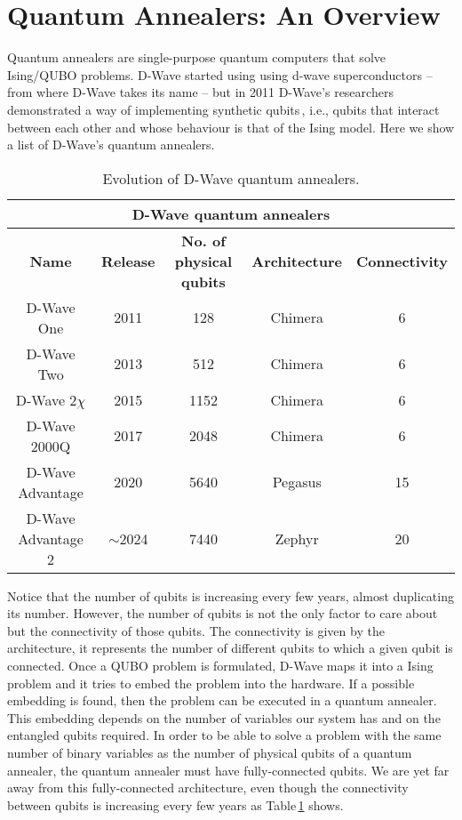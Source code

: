 \section{Quantum Annealers: An Overview} 
Quantum annealers are single-purpose quantum computers that solve Ising/QUBO problems. D-Wave started using using d-wave superconductors -- from where D-Wave takes its name -- but in 2011 D-Wave's researchers demonstrated a way of implementing synthetic qubits\,\cite{Johnson2011QuantumSpins}, i.e., qubits that interact between each other and whose behaviour is that of the Ising model. Here we show a list of D-Wave's quantum annealers.
\begin{table}[H]
\centering
\begin{tabular}{ |c|c|c|c|c|  }
 \hline
 \multicolumn{5}{|c|}{\textbf{D-Wave quantum annealers}} \\
 \hline
 \textbf{Name} & \textbf{Release} & \textbf{No. of physical qubits} & \textbf{Architecture} & \textbf{Connectivity}\\
 \hline
 D-Wave One         & 2011 & 128      & Chimera & 6\\
  \hline
 D-Wave Two         & 2013 & 512      & Chimera & 6\\
  \hline
 D-Wave 2$\chi$     & 2015 & 1152     & Chimera & 6\\
  \hline
 D-Wave 2000Q       & 2017 & 2048     & Chimera & 6\\
  \hline
 D-Wave Advantage   & 2020 & 5640     & Pegasus & 15\\
  \hline
 D-Wave Advantage 2 & $\sim$2024 & 7440 & Zephyr  & 20\\
 \hline
\end{tabular}
\caption{Evolution of D-Wave quantum annealers.}
\label{tab:DwaveAnnealers}
\end{table}
Notice that the number of qubits is increasing every few years, almost duplicating its number. However, the number of qubits is not the only factor to care about but the connectivity of those qubits. The connectivity is given by the architecture, it represents the number of different qubits to which a given qubit is connected. Once a QUBO problem is formulated, D-Wave maps it into a Ising problem and it tries to embed the problem into the hardware. If a possible embedding is found, then the problem can be executed in a quantum annealer. This embedding depends on the number of variables our system has and on the entangled qubits required. In order to be able to solve a problem with the same number of binary variables as the number of physical qubits of a quantum annealer, the quantum annealer must have fully-connected qubits. We are yet far away from this fully-connected architecture, even though the connectivity between qubits is increasing every few years as Table\,\ref{tab:DwaveAnnealers} shows.